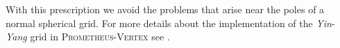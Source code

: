 With this prescription we avoid the problems that arise
near the poles of a normal spherical grid.
For more details about the implementation of the \textit{Yin}-\textit{Yang} grid
in \textsc{Prometheus-Vertex} see \cite{melson_phd}.  


